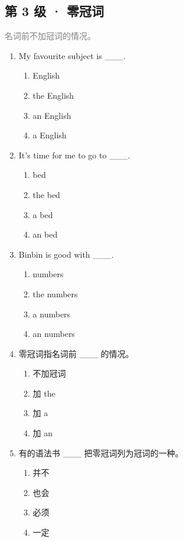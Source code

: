\documentclass[11pt,a4paper]{ctexart}
\begin{document}
\subsection*{第 3 级 · 零冠词}
\noindent\textcolor{gray}{名词前不加冠词的情况。}\par\smallskip
\begin{enumerate}[leftmargin=*,itemsep=4pt]
\item My favourite subject is \_\_\_.
\begin{enumerate}[label=\Alph*.,leftmargin=2em,itemsep=1pt,topsep=2pt]
\item English
\item the English
\item an English
\item a English
\end{enumerate}
\item It’s time for me to go to \_\_\_.
\begin{enumerate}[label=\Alph*.,leftmargin=2em,itemsep=1pt,topsep=2pt]
\item bed
\item the bed
\item a bed
\item an bed
\end{enumerate}
\item Binbin is good with \_\_\_.
\begin{enumerate}[label=\Alph*.,leftmargin=2em,itemsep=1pt,topsep=2pt]
\item numbers
\item the numbers
\item a numbers
\item an numbers
\end{enumerate}
\item 零冠词指名词前 \_\_\_ 的情况。
\begin{enumerate}[label=\Alph*.,leftmargin=2em,itemsep=1pt,topsep=2pt]
\item 不加冠词
\item 加 the
\item 加 a
\item 加 an
\end{enumerate}
\item 有的语法书 \_\_\_ 把零冠词列为冠词的一种。
\begin{enumerate}[label=\Alph*.,leftmargin=2em,itemsep=1pt,topsep=2pt]
\item 并不
\item 也会
\item 必须
\item 一定

\end{enumerate}
\end{enumerate}
\end{document}
